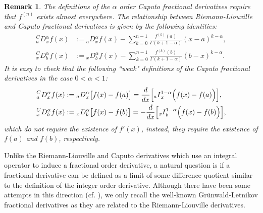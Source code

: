 \documentclass[leqno,final]{siamltex}
\numberwithin{equation}{section}
\newtheorem{remark}{Remark}[section]
\renewcommand{\(}{\bigl(}
\renewcommand{\)}{\bigr)}
\begin{document}
            \begin{remark}
                The definitions of the $\alpha$ order Caputo fractional derivatives require that $f^{(n)}$  exists almost everywhere. %
                The relationship between Riemann-Liouville and Caputo fractional derivatives is given by the following identities: 
                \begin{align}\label{RL_Caputo_l}
                    {^{C}_{a}}{{D}}{_{x}^{\alpha}} f(x) &:= {_{a}}{{D}}{_{x}^{\alpha}} f(x) -\sum_{k=0}^{n-1} \frac{f^{(k)}(a)}{\Gamma(k+1-\alpha)} (x-a)^{k-\alpha},\\
                    {^{C}_{x}}{{D}}{_{b}^{\alpha}} f(x) &:={_{x}}{{D}}{^{\alpha}_{b}} f(x) -\sum_{k=0}^{n-1}\frac{f^{(k)}(b)}{\Gamma(k+1-\alpha) } (b-x)^{k-\alpha}.
                    \label{RL_Caputo_r} 
                \end{align}
                It is easy to check that the following ``weak" definitions of the Caputo fractional derivatives in the case $0<\alpha<1$: 
                \begin{align}\label{weak_RL_Caputo_l} 
                    {^{C}_{a}}{{D}}{_{x}^{\alpha}} f(x) &:= {_{a}}{{D}}{_{x}^{\alpha}} \bigl[ f(x) -f(a) \bigr] =\frac{d}{dx} \Bigl[ {_{a}}{I}{^{1-\alpha}_{x}} \Bigl( f(x)-f(a) \Bigr) \Bigr],\\
                    {^{C}_{x}}{{D}}{_{b}^{\alpha}} f(x) &:={_{x}}{{D}}{^{\alpha}_{b}} \bigl[ f(x)-f(b) \bigr] =-\frac{d}{dx} \Bigl[{_{x}}{I}{^{1-\alpha}_{b}} \Bigl( f(x) -f(b) \Bigr) \Bigr],
                    \label{weak_RL_Caputo_r} 
                \end{align}
                which do not require the existence of $f'(x)$, instead, they require the existence of $f(a)$ and $f(b)$, respectively.
            \end{remark} 

        Unlike the Riemann-Liouville and Caputo derivatives which use an integral operator to induce a fractional order derivative, a natural question is if a fractional derivative can be defined as a limit of some difference quotient similar to the definition of the integer order derivative. Although there have been some attempts in this direction (cf. \cite{Khalil2014}), %
      we only recall the well-known Gr\"{u}nwald-Letnikov fractional derivatives as they are related to the Riemann-Liouville derivatives.
	
\end{document}
